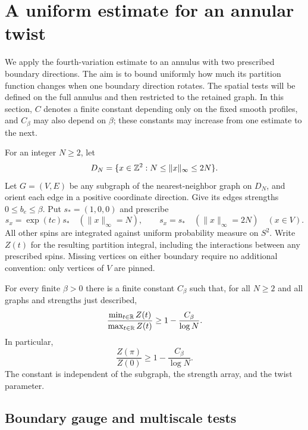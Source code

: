 \section{A uniform estimate for an annular twist}\label{sec:annulus}

We apply the fourth-variation estimate to an annulus with two prescribed
boundary directions.  The aim is to bound uniformly how much its partition
function changes when one boundary direction rotates.  The spatial tests
will be defined on the full annulus and then restricted to the retained
graph.
In this section, $C$ denotes a finite constant depending only on the
fixed smooth profiles, and $C_\beta$ may also depend on $\beta$;
these constants may increase from one estimate to the next.

For an integer $N\geq 2$, let
\[
 D_N=\{x\in\mathbb Z^2:N\leq\|x\|_\infty\leq 2N\}.
\]
Let $G=(V,E)$ be any subgraph of the nearest-neighbor graph on $D_N$,
and orient each edge in a positive coordinate direction.  Give its edges
strengths $0\leq b_e\leq\beta$.  Put $s_*=(1,0,0)$ and prescribe
\[
 s_x=\exp(tc)s_*\quad(\|x\|_\infty=N),
 \qquad
 s_x=s_*\quad(\|x\|_\infty=2N)
 \quad (x\in V).
\]
All other spins are integrated against uniform probability measure on
$S^2$.  Write $Z(t)$ for the resulting partition integral, including the
interactions between any prescribed spins.  Missing vertices on either
boundary require no additional convention: only vertices of $V$ are
pinned.

\begin{proposition}\label{prop:annulus}
For every finite $\beta>0$ there is a finite constant $C_\beta$ such that,
for all $N\geq2$ and all graphs and strengths just described,
\begin{equation}\label{eq:annulus-minmax}
 \frac{\min_{t\in\mathbb R}Z(t)}{\max_{t\in\mathbb R}Z(t)}
 \geq 1-\frac{C_\beta}{\log N}.
\end{equation}
In particular,
\begin{equation}\label{eq:annulus-ratio}
 \frac{Z(\pi)}{Z(0)}\geq1-\frac{C_\beta}{\log N}.
\end{equation}
The constant is independent of the subgraph, the strength array, and
the twist parameter.
\end{proposition}

\subsection{Boundary gauge and multiscale tests}

